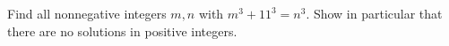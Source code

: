 Find all nonnegative integers $m,n$ with $m^3+11^3=n^3$. Show in particular that there are no solutions in positive integers.
